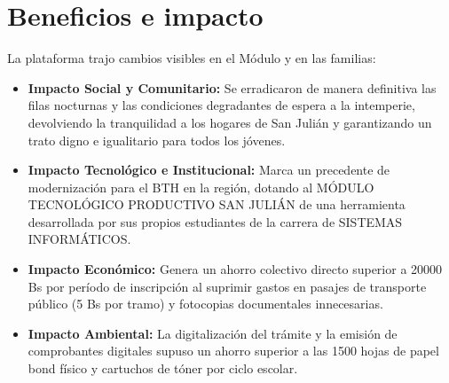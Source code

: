 \section{Beneficios e impacto}
\label{sec:beneficios_impacto}

La plataforma trajo cambios visibles en el Módulo y en las familias:

\begin{itemize}
    \item \textbf{Impacto Social y Comunitario:} Se erradicaron de manera definitiva las filas nocturnas y las condiciones degradantes de espera a la intemperie, devolviendo la tranquilidad a los hogares de San Julián y garantizando un trato digno e igualitario para todos los jóvenes.
    \item \textbf{Impacto Tecnológico e Institucional:} Marca un precedente de modernización para el BTH en la región, dotando al MÓDULO TECNOLÓGICO PRODUCTIVO SAN JULIÁN de una herramienta desarrollada por sus propios estudiantes de la carrera de SISTEMAS INFORMÁTICOS.
    \item \textbf{Impacto Económico:} Genera un ahorro colectivo directo superior a 20000 Bs por período de inscripción al suprimir gastos en pasajes de transporte público (5 Bs por tramo) y fotocopias documentales innecesarias.
    \item \textbf{Impacto Ambiental:} La digitalización del trámite y la emisión de comprobantes digitales supuso un ahorro superior a las 1500 hojas de papel bond físico y cartuchos de tóner por ciclo escolar.
\end{itemize}
